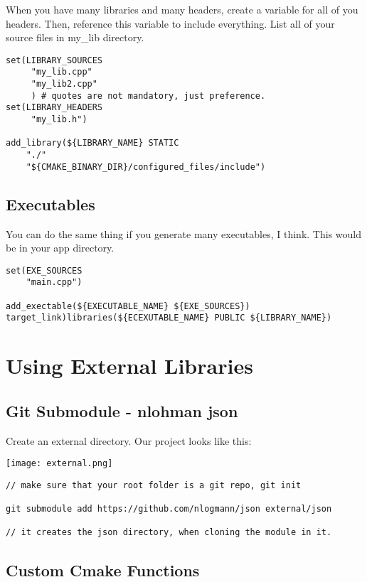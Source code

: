 When you have many libraries and many headers, create a variable for all of you headers. Then, reference this variable to include
everything. List all of your source files in my\_lib directory.

\begin{verbatim}
set(LIBRARY_SOURCES
     "my_lib.cpp"
     "my_lib2.cpp"
     ) # quotes are not mandatory, just preference.
set(LIBRARY_HEADERS
     "my_lib.h")

add_library(${LIBRARY_NAME} STATIC
    "./"
    "${CMAKE_BINARY_DIR}/configured_files/include")
\end{verbatim}

\subsection{Executables}

You can do the same thing if you generate many executables, I think. This would be in your app directory.

\begin{verbatim}
set(EXE_SOURCES
    "main.cpp")

add_exectable(${EXECUTABLE_NAME} ${EXE_SOURCES})
target_link)libraries(${ECEXUTABLE_NAME} PUBLIC ${LIBRARY_NAME})
\end{verbatim}


\section{Using External Libraries}


\subsection{Git Submodule - nlohman json}

Create an external directory. Our project looks like this:

\begin{center}
    \texttt{[image: external.png]}
\end{center}

\begin{verbatim}
// make sure that your root folder is a git repo, git init

git submodule add https://github.com/nlogmann/json external/json

// it creates the json directory, when cloning the module in it.
\end{verbatim}

\subsection{Custom Cmake Functions}

